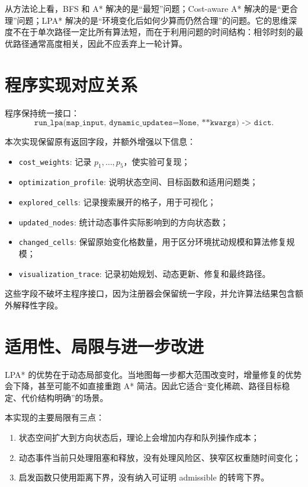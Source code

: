 \documentclass[UTF8]{ctexart}
\begin{document}
从方法论上看，BFS 和 A* 解决的是“最短”问题；Cost-aware A* 解决的是“更合理”问题；LPA* 解决的是“环境变化后如何少算而仍然合理”的问题。它的思维深度不在于单次路径一定比所有算法短，而在于利用问题的时间结构：相邻时刻的最优路径通常高度相关，因此不应丢弃上一轮计算。

\section{程序实现对应关系}

程序保持统一接口：
\[
    \texttt{run\_lpa(map\_input, dynamic\_updates=None, **kwargs) -> dict}.
\]

本次实现保留原有返回字段，并额外增强以下信息：

\begin{itemize}[leftmargin=2em]
    \item \texttt{cost\_weights}: 记录 $p_1,\ldots,p_5$，使实验可复现；
    \item \texttt{optimization\_profile}: 说明状态空间、目标函数和适用问题类；
    \item \texttt{explored\_cells}: 记录搜索展开的格子，用于可视化；
    \item \texttt{updated\_nodes}: 统计动态事件实际影响到的方向状态数；
    \item \texttt{changed\_cells}: 保留原始变化格数量，用于区分环境扰动规模和算法修复规模；
    \item \texttt{visualization\_trace}: 记录初始规划、动态更新、修复和最终路径。
\end{itemize}

这些字段不破坏主程序接口，因为注册器会保留统一字段，并允许算法结果包含额外解释性字段。

\section{适用性、局限与进一步改进}

LPA* 的优势在于动态局部变化。当地图每一步都大范围改变时，增量修复的优势会下降，甚至可能不如直接重跑 A* 简洁。因此它适合“变化稀疏、路径目标稳定、代价结构明确”的场景。

本实现的主要局限有三点：

\begin{enumerate}[leftmargin=2em]
    \item 状态空间扩大到方向状态后，理论上会增加内存和队列操作成本；
    \item 动态事件当前只处理阻塞和释放，没有处理风险区、狭窄区权重随时间变化；
    \item 启发函数只使用距离下界，没有纳入可证明 admissible 的转弯下界。
\end{enumerate}
\end{document}
